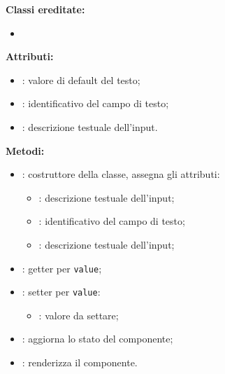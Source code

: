 \textbf{Classi ereditate:}
\begin{itemize}
	\item {}
\end{itemize}


\textbf{Attributi:}
\begin{itemize}
	\item {}: valore di default del testo;
	\item {}: identificativo del campo di testo;
	\item {}: descrizione testuale dell'input.
\end{itemize}

\textbf{Metodi:}
\begin{itemize}
	\item {}: costruttore della classe, assegna gli attributi:
	\begin{itemize}
		\item {}: descrizione testuale dell'input;
		\item {}: identificativo del campo di testo;
		\item {}: descrizione testuale dell'input;
	\end{itemize}
	\item {}: getter per \texttt{value};
	\item {}: setter per \texttt{value}:
	\begin{itemize}
	\item {}: valore da settare;
	\end{itemize}
	\item {}: aggiorna lo stato del componente;
	\item {}: renderizza il componente.
\end{itemize}


